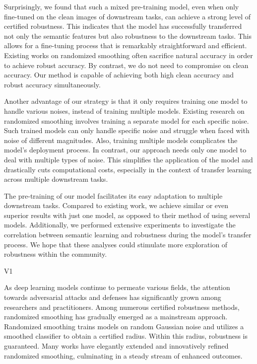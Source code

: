Surprisingly, we found that such a mixed pre-training model, even when only fine-tuned on the clean images of downstream tasks, can achieve a strong level of certified robustness.
This indicates that the model has successfully transferred not only the semantic features but also robustness to the downstream tasks.
This allows for a fine-tuning process that is remarkably straightforward and efficient.
Existing works on randomized smoothing often sacrifice natural accuracy in order to achieve robust accuracy.
By contrast, we do not need to compromise on clean accuracy.
Our method is capable of achieving both high clean accuracy and robust accuracy simultaneously.


Another advantage of our strategy is that it only requires training one model to handle various noises, instead of training multiple models.
Existing research on randomized smoothing involves training a separate model for each specific noise.
Such trained models can only handle specific noise and struggle when faced with noise of different magnitudes.
Also, training multiple models complicates the model's deployment process.
In contrast, our approach needs only one model to deal with multiple types of noise. This simplifies the application of the model and drastically cuts computational costs, especially in the context of transfer learning across multiple downstream tasks.


The pre-training of our model facilitates its easy adaptation to multiple downstream tasks.
Compared to existing work, we achieve similar or even superior results with just one model, as opposed to their method of using several models.
Additionally, we performed extensive experiments to investigate the correlation between semantic learning and robustness during the model's transfer process.
We hope that these analyses could stimulate more exploration of robustness within the community.





\iffalse



V1

As deep learning models continue to permeate various fields, the attention towards adversarial attacks and defenses has significantly grown among researchers and practitioners. 
Among numerous certified robustness methods, randomized smoothing has gradually emerged as a mainstream approach.
Randomized smoothing trains models on random Gaussian noise and utilizes a smoothed classifier to obtain a certified radius. Within this radius, robustness is guaranteed.
Many works have elegantly extended and innovatively refined randomized smoothing, culminating in a steady stream of enhanced outcomes.

